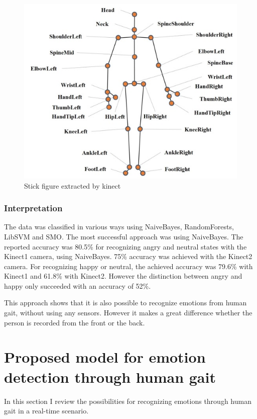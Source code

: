 \documentclass[conference]{IEEEtran}
\begin{document}
\begin{figure}[H]
\centering
\includegraphics[width=\linewidth]{kinectStick.jpg}
\caption{Stick figure extracted by kinect\cite{li2016emotion}}
\label{fig:kinectStick}
\end{figure}

\subsubsection{Interpretation}
The data was classified in various ways using NaiveBayes, RandomForests, LibSVM and SMO\cite{li2016emotion}. The most successful approach was using NaiveBayes.  
The reported accuracy was 80.5\% for recognizing angry and neutral states with the Kinect1 camera, using NaiveBayes. 75\% accuracy was achieved with the Kinect2 camera.
For recognizing happy or neutral, the achieved accuracy was 79.6\% with Kinect1 and 61.8\% with Kinect2. However the distinction between angry and happy only succeeded with an accuracy of 52\%\cite{li2016emotion}.

This approach shows that it is also possible to recognize emotions from human gait, without using any sensors. However it makes a great difference whether the person is recorded from the front or the back.


\section{Proposed model for emotion detection through human gait}
In this section I review the possibilities for recognizing emotions through human gait in a real-time scenario.
\end{document}
